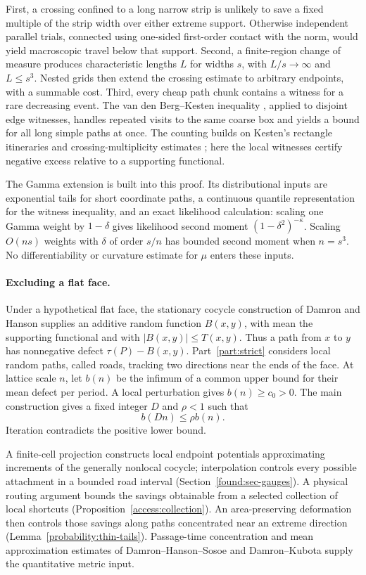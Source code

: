 First, a crossing confined to a long narrow strip is unlikely to save
a fixed multiple of the strip width over either extreme support.
Otherwise independent parallel trials, connected using one-sided
first-order contact with the norm, would yield macroscopic travel
below that support. Second, a finite-region change of measure produces
characteristic lengths $L$ for widths $s$, with $L/s\to\infty$ and
$L\le s^3$. Nested grids then extend the crossing estimate to arbitrary
endpoints, with a summable cost. Third, every cheap path chunk contains
a witness for a rare decreasing event. The van den Berg--Kesten
inequality \cite{BK85}, applied to disjoint edge witnesses, handles
repeated visits to the same coarse box and yields a bound for all
long simple paths at once. The counting builds on Kesten's rectangle
itineraries and crossing-multiplicity estimates
\cite[Section~3]{Kesten1980}; here the local witnesses certify negative
excess relative to a supporting functional.

The Gamma extension is built into this proof. Its distributional inputs
are exponential tails for short coordinate paths, a continuous quantile
representation for the witness inequality, and an exact likelihood
calculation: scaling one Gamma weight by $1-\delta$ gives likelihood
second moment $(1-\delta^2)^{-\kappa}$. Scaling $O(ns)$ weights with
$\delta$ of order $s/n$ has bounded second moment when $n=s^3$.
No differentiability or curvature estimate for $\mu$ enters these inputs.

\paragraph{Excluding a flat face.}
Under a hypothetical flat face, the stationary cocycle construction of
Damron and Hanson \cite{DH2014} supplies an additive random function
$B(x,y)$, with mean the supporting functional and with
$|B(x,y)|\le T(x,y)$. Thus a path from $x$ to $y$ has nonnegative
defect $\tau(P)-B(x,y)$. Part~\ref{part:strict} considers local random
paths, called roads, tracking two directions near the ends of the face.
At lattice scale $n$, let $b(n)$ be the infimum of a common upper bound
for their mean defect per period. A local perturbation gives
$b(n)\ge c_0>0$. The main construction gives a fixed integer $D$ and
$\rho<1$ such that
\[
 b(Dn)\le\rho b(n).
\]
Iteration contradicts the positive lower bound.

A finite-cell projection constructs local endpoint potentials
approximating increments of the generally nonlocal cocycle; interpolation
controls every possible attachment in a bounded road interval
(Section~\ref{found:sec-gauges}). A physical routing argument bounds the
savings obtainable from a selected collection of local shortcuts
(Proposition~\ref{access:collection}). An area-preserving deformation
then controls those savings along paths concentrated near an extreme
direction (Lemma~\ref{probability:thin-tails}). Passage-time concentration
and mean approximation estimates of Damron--Hanson--Sosoe \cite{DHS2014}
and Damron--Kubota \cite{DK2016} supply the quantitative metric input.

